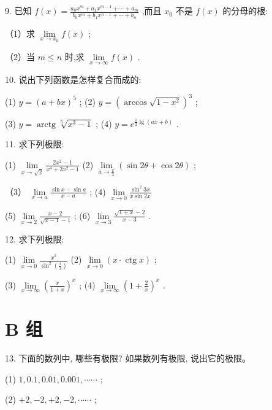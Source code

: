 \documentclass[10pt]{article}
\begin{document}
9. 已知 \(f\left( x\right) = \frac{{a}_{0}{x}^{m} + {a}_{1}{x}^{m - 1} + \cdots + {a}_{m}}{{b}_{0}{x}^{m} + {b}_{1}{x}^{n - 1} + \cdots + {b}_{n}}\) ,而且 \({x}_{0}\) 不是 \(f\left( x\right)\) 的分母的根:

（1）求 \(\mathop{\lim }\limits_{{x \rightarrow {x}_{0}}}f\left( x\right)\) ;

（2）当 \(m \leq n\) 时,求 \(\mathop{\lim }\limits_{{x \rightarrow \infty }}f\left( x\right)\) .

10. 说出下列函数是怎样复合而成的:

(1) \(y = {\left( a + bx\right) }^{5}\) ; (2) \(y = {\left( \arccos \sqrt{1 - {x}^{2}}\right) }^{3}\) ;

(3) \(y = \operatorname{arctg}\sqrt[5]{{x}^{3} - 1}\) ; (4) \(y = {e}^{\frac{1}{2}\lg \left( {{ax} + b}\right) }\) .

11. 求下列极限:

(1) \(\mathop{\lim }\limits_{{x \rightarrow \sqrt{2}}}\frac{2{x}^{2} - 1}{{x}^{4} + 2{x}^{2} - 1}\) (2) \(\mathop{\lim }\limits_{{a \rightarrow \frac{\pi }{3}}}\left( {\sin {2\theta } + \cos {2\theta }}\right)\) ;

（3） \(\mathop{\lim }\limits_{{x \rightarrow a}}\frac{\sin x - \sin a}{x - a}\) ; (4) \(\mathop{\lim }\limits_{{x \rightarrow 0}}\frac{{\sin }^{2}{3x}}{x\sin {2x}}\)

(5) \(\mathop{\lim }\limits_{{x \rightarrow 2}}\frac{x - 2}{\sqrt{x - 1} - 1}\) ; (6) \(\mathop{\lim }\limits_{{x \rightarrow 3}}\frac{\sqrt{1 + x} - 2}{x - 3}\) .

12. 求下列极限:

(1) \(\mathop{\lim }\limits_{{x \rightarrow 0}}\frac{{x}^{2}}{{\sin }^{2}\left( \frac{x}{3}\right) }\) (2) \(\mathop{\lim }\limits_{{x \rightarrow 0}}\left( {x \cdot \operatorname{ctg}x}\right)\) ;

(3) \(\mathop{\lim }\limits_{{x \rightarrow \infty }}{\left( \frac{x}{1 + x}\right) }^{x}\) ; (4) \(\mathop{\lim }\limits_{{x \rightarrow \infty }}{\left( 1 + \frac{2}{x}\right) }^{x}\) .

\section*{B 组}

13. 下面的数列中, 哪些有极限? 如果数列有极限, 说出它的极限。

(1) \(1,{0.1},{0.01},{0.001},\cdots \cdots\) ;

(2) \(+ 2, - 2, + 2, - 2,\cdots \cdots\) ;
\end{document}
